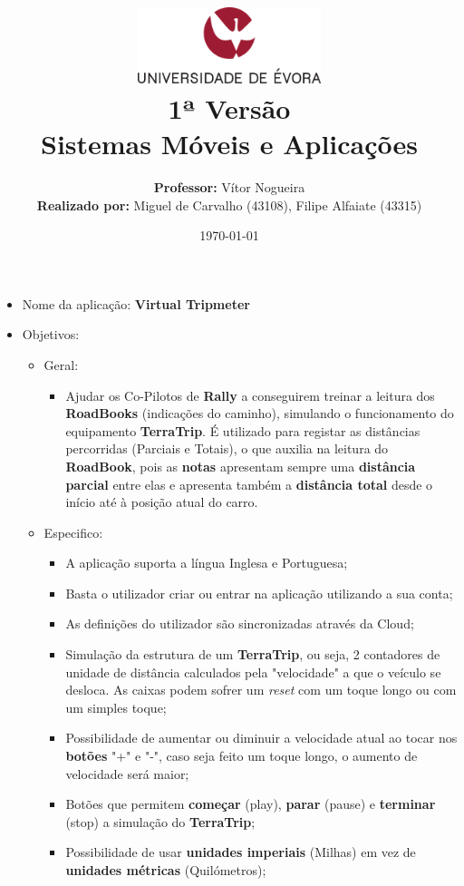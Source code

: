 \documentclass[11pt]{article}
\title
{
    \includegraphics[width=0.4\textwidth]{university.png}
    \\[0.1cm]
    \textbf{1ª Versão} \\
    Sistemas Móveis e Aplicações
}
\author
{
    \textbf{Professor:} Vítor Nogueira \\
    \textbf{Realizado por:} Miguel de Carvalho (43108), Filipe Alfaiate (43315)
}
\date{\today}
\begin{document}
\maketitle

\begin{itemize}
    \item Nome da aplicação: \textbf{Virtual Tripmeter}
    \item Objetivos: 
    \begin{itemize}
        \item Geral:
        \begin{itemize}
            \item Ajudar os Co-Pilotos de \textbf{Rally} a conseguirem treinar a leitura dos \textbf{RoadBooks} (indicações do caminho), simulando o funcionamento do equipamento \textbf{TerraTrip}. É utilizado para registar as distâncias percorridas (Parciais e Totais), o que auxilia na leitura do \textbf{RoadBook}, pois as \textbf{notas} apresentam sempre uma \textbf{distância parcial} entre elas e apresenta também a \textbf{distância total} desde o início até à posição atual do carro.
        \end{itemize}
        \item Especifico:
        \begin{itemize}
            \item A aplicação suporta a língua Inglesa e Portuguesa;
            \item Basta o utilizador criar ou entrar na aplicação utilizando a sua conta;
            \item As definições do utilizador são sincronizadas através da Cloud;
            \item Simulação da estrutura de um \textbf{TerraTrip}, ou seja, 2 contadores de unidade de distância calculados pela "velocidade" a que o veículo se desloca. As caixas podem sofrer um \textit{reset} com um toque longo ou com um simples toque;
            \item Possibilidade de aumentar ou diminuir a velocidade atual ao tocar nos \textbf{botões} "+" e "-", caso seja feito um toque longo, o aumento de velocidade será maior;
            \item Botões que permitem \textbf{começar} (play), \textbf{parar} (pause) e \textbf{terminar} (stop) a simulação do \textbf{TerraTrip};
            \item Possibilidade de usar \textbf{unidades imperiais} (Milhas) em vez de \textbf{unidades métricas} (Quilómetros);

\end{itemize}
\end{itemize}
\end{itemize}
\end{document}
